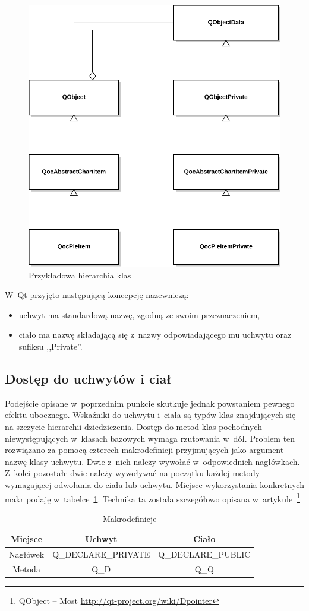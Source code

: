 \begin{figure}
\centering
\caption{Przykładowa hierarchia klas}\label{rys:dpointer}
\includegraphics[scale=0.8]{img/dpointer.pdf}
\end{figure}

W~Qt przyjęto następującą koncepcję nazewniczą:
\begin{itemize}
\item{uchwyt ma standardową nazwę, zgodną ze swoim przeznaczeniem,}
\item{ciało ma nazwę składającą się z~nazwy odpowiadającego mu uchwytu oraz sufiksu ,,Private''.}
\end{itemize}


\subsection{Dostęp do uchwytów i ciał}
Podejście opisane w~poprzednim punkcie skutkuje jednak powstaniem pewnego efektu ubocznego.
Wskaźniki do uchwytu i~ciała są typów klas znajdujących się na szczycie hierarchii dziedziczenia. Dostęp do metod klas pochodnych niewystępujących w~klasach bazowych wymaga rzutowania w~dół. 
Problem ten rozwiązano za pomocą czterech makrodefinicji przyjmujących jako argument nazwę klasy uchwytu. Dwie z~nich należy wywołać w~odpowiednich nagłówkach. Z~kolei pozostałe dwie należy wywoływać na początku każdej metody wymagającej odwołania do ciała lub uchwytu. Miejsce wykorzystania konkretnych makr podaję w~tabelce~\ref{tab:makra}. Technika ta została szczegółowo opisana w~artykule~\footnote{QObject -- Most \url{http://qt-project.org/wiki/Dpointer}}

\begin{table}[h]\footnotesize
\centering
\caption{Makrodefinicje}
\label{tab:makra}
\begin{tabular}{|c|c|c|}
\hline
Miejsce & Uchwyt & Ciało\\
\hline
Nagłówek & Q\_DECLARE\_PRIVATE & Q\_DECLARE\_PUBLIC\\
\hline
Metoda & Q\_D & Q\_Q\\
\hline
\end{tabular}
\end{table}

